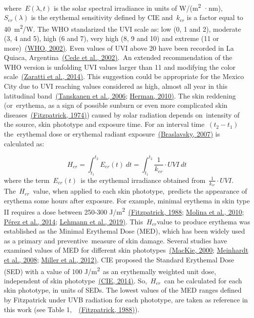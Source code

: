 \documentclass[10pt]{article}
\begin{document}
where\emph{~\(E\left(\lambda,t\right)\)} is the solar spectral irradiance in
units of W/(m\textsuperscript{2} ·nm),~\emph{~\(S_{er}\left(\lambda\right)\)} is the
erythemal sensitivity defined by CIE and~\(k_{er}\) is a factor
equal to 40~m\textsuperscript{2}/W. The WHO standarized the UVI scale
as: low (0, 1 and 2), moderate (3, 4 and 5), high (6 and 7), very high
(8, 9 and 10) and extreme (11 or more)~\hyperref[csl:24]{(WHO, 2002)}. Even values
of UVI above 20 have been recorded in La Quiaca,
Argentina~\hyperref[csl:25]{(Cede et al., 2002)}.~An extended recommendation of the WHO
version is unfolding UVI values larger than 11 and modifying the color
scale~\hyperref[csl:26]{(Zaratti et al., 2014)}. This suggestion could be appropriate for the
Mexico City due to UVI reaching values considered as high, almost all
year in this latitudinal band~\hyperref[csl:27]{(Tanskanen et al., 2006}; \hyperref[csl:28]{Herman, 2010)}. The skin reddening
(or~erythema, as a sign of possible sunburn or even more complicated
skin diseases~\hyperref[csl:22]{(Fitzpatrick, 1974)}) caused by solar radiation depends
on~intensity of the source, skin phototype and exposure time. For an
interval time~\((t_2-t_1)\) the~erythemal dose or erythemal radiant
exposure~\hyperref[csl:29]{(Braslavsky, 2007)} is calculated as:

\emph{\textbf{\[H_{er}=\int_{t_{1}}^{t_{2}}{E_{er}(t)}\ dt=\int_{t_{1}}^{t_{2}}{\frac{1}{k_{er}}\cdot UVI}\ dt\]}}where the term~\(E_{er}(t)\)~is
the erythemal irradiance obtained from~\(\frac{1}{k_{er}}\cdot UVI\).
The~\(H_{er}\)~value, when applied to each skin
phototype,~predicts the appearance of erythema some hours after
exposure. For example, minimal erythema in skin type II requires a dose
between 250-300 J/m\textsuperscript{2}~\hyperref[csl:30]{(Fitzpatrick, 1988}; \hyperref[csl:4]{Molina et al., 2010}; \hyperref[csl:31]{Pérez et al., 2014}; \hyperref[csl:32]{Lehmann et al., 2019)}.
This~\(H_{er}\)value to produce erythema was established as the
Minimal Erythemal Dose (MED), which has been widely used as a primary
and preventive~measure of skin damage. Several studies have examined
values of MED for different skin phototypes~\hyperref[csl:33]{(MacKie, 2000}; \hyperref[csl:34]{Meinhardt et al., 2008}; \hyperref[csl:35]{Miller et al., 2012)}. CIE
proposed the Standard Erythemal Dose (SED) with a value of 100
J/m\textsuperscript{2~}as an erythemally weighted unit dose, independent
of skin phototype~\hyperref[csl:23]{(CIE, 2014)}. So,~\(H_{er}\)~can be
calculated for each skin phototype, in units of SEDs. The lowest values
of the MED ranges defined by Fitzpatrick under UVB radiation for each
phototype, are taken as reference in this work (see Table
1,~~\hyperref[csl:30]{(Fitzpatrick, 1988)}).
\end{document}
